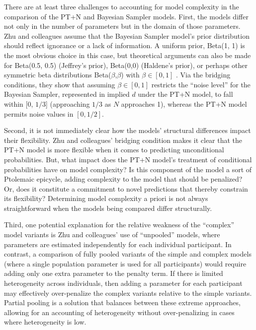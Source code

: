 \documentclass[
  english,
  man,floatsintext]{apa6}
\begin{document}
There are at least three challenges to accounting for model complexity in the comparison of the PT+N and Bayesian Sampler models. First, the models differ not only in the number of parameters but in the domain of those parameters. Zhu and colleagues \autocite*{zhu.etal2020} assume that the Bayesian Sampler model's prior distribution should reflect ignorance or a lack of information. A uniform prior, Beta(1, 1) is the most obvious choice in this case, but theoretical arguments can also be made for Beta(0.5, 0.5) (Jeffrey's prior), Beta(0,0) (Haldene's prior), or perhaps other symmetric beta distributions Beta(\(\beta\),\(\beta\)) with \(\beta \in [0, 1]\) \autocite{jaynes2003}. Via the bridging conditions, they show that assuming \(\beta \in [0, 1]\) restricts the ``noise level'' for the Bayesian Sampler, represented in implied \(d\) under the PT+N model, to fall within {[}0, \(1/3\){]} (approaching \(1/3\) as \(N\) approaches 1), whereas the PT+N model permits noise values in \([0, 1/2]\).

Second, it is not immediately clear how the models' structural differences impact their flexibility. Zhu and colleagues' \autocite*{zhu.etal2020} bridging condition makes it clear that the PT+N model is more flexible when it comes to predicting unconditional probabilities. But, what impact does the PT+N model's treatment of conditional probabilities have on model complexity? Is this component of the model a sort of Ptolemaic epicycle, adding complexity to the model that should be penalized? Or, does it constitute a commitment to novel predictions that thereby constrain its flexibility? Determining model complexity a priori is not always straightforward when the models being compared differ structurally.

Third, one potential explanation for the relative weakness of the ``complex'' model variants is Zhu and colleagues' \autocite*{zhu.etal2020} use of ``unpooled'' models, where parameters are estimated independently for each individual participant. In contrast, a comparison of fully pooled variants of the simple and complex models (where a single population parameter is used for all participants) would require adding only one extra parameter to the penalty term. If there is limited heterogeneity across individuals, then adding a parameter for each participant may effectively over-penalize the complex variants relative to the simple variants. Partial pooling is a solution that balances between these extreme approaches, allowing for an accounting of heterogeneity without over-penalizing in cases where heterogeneity is low.
\end{document}
